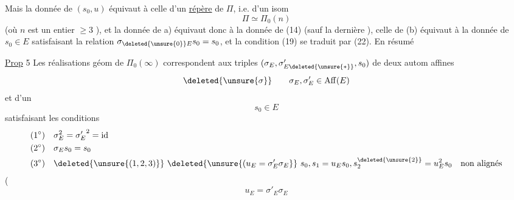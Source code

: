 Mais la donnée de $(s_0,u)$ équivaut à celle d'un \uline{répère} de $\Pi$, i.e. d'un isom 
\[
\Pi\simeq\Pi_0(n)
\]
(où $n$  est un entier $\geq3$ ), et la donnée de a)  équivaut donc à la donnée de (14) (sauf la dernière  ),  celle de (b) équivaut à la donnée de $s_0\in E$ satisfaisant la  relation $\sigma_{\deleted{\unsure{0}}E}s_0=s_0$, et la condition (19) se traduit par (22). En résumé

\uline{Prop} 5 Les  réalisations géom  de $\Pi_0(\infty)$  correspondent aux  triples $(\sigma_E,\sigma'_{E\deleted{\unsure{*}}},s_0)$ de deux autom affines  
\[
\deleted{\unsure{\sigma}}\qquad\sigma_E,\sigma'_E\in\mathrm{Aff}(E)
\]
et d'un 
\[
s_0\in E
\]
satisfaisant les conditions
\[
\begin{aligned}
(1^\circ)\quad &\sigma_E^2={\sigma'_E}^2=\mathrm{id}\\
(2^\circ)\quad &\sigma_Es_0=s_0\\
(3^\circ)\quad &\deleted{\unsure{(1,2,3)}}\ \deleted{\unsure{(u_E=\sigma'_E\sigma_E}}\ 
s_0,s_1=u_Es_0,s^{\deleted{\unsure{2}}}_2=u_E^2s_0\quad\text{non alignés}
\end{aligned}
\]
(  
\[
u_E=\sigma'_E\sigma_E
\]
